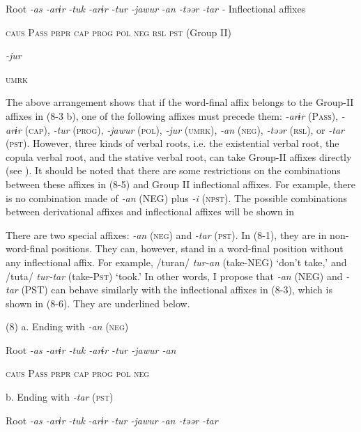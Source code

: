   Root  \textit{{}-as  {}-arɨr} %
\textit{{}-tuk  {}-arɨr  {}-tur  {}-jawur} %
\textit{{}-an  {}-təər  {}-tar  {}-} Inflectional affixes

    \textsc{caus}  P\textsc{ass}  \textsc{prpr}  \textsc{cap}  \textsc{prog}  \textsc{pol}  \textsc{neg}  \textsc{rsl}  \textsc{pst}  (Group II)

          \textit{{}-jur} 

          \textsc{umrk}

The above arrangement shows that if the word-final affix belongs to the Group-II affixes in (8-3 b), one of the following affixes must precede them: \textit{{}-arɨr} (P\textsc{ass}), \textit{-arɨr} (\textsc{cap}), \textit{-tur} (\textsc{prog}), \textit{{}-jawur} (\textsc{pol}), \textit{{}-jur} (\textsc{umrk}), \textit{{}-an} (\textsc{neg}), \textit{{}-təər} (\textsc{rsl}), or \textit{{}-tar} (\textsc{pst}). However, three kinds of verbal roots, i.e. the existential verbal root, the copula verbal root, and the stative verbal root, can take Group-II affixes directly (see ). It should be noted that there are some restrictions on the combinations between these affixes in (8-5) and Group II inflectional affixes. For example, there is no combination made of \textit{{}-an} (NEG) plus \textit{{}-i} (\textsc{npst}). The possible combinations between derivational affixes and inflectional affixes will be shown in 

There are two special affixes: \textit{{}-an} (\textsc{neg}) and \textit{-tar} (\textsc{pst}). In (8-1), they are in non-word-final positions. They can, however, stand in a word-final position without any inflectional affix. For example, /turan/ \textit{tur-an} (take-NEG) ‘don’t take,’ and /tuta/ \textit{tur-tar} (take-P\textsc{st}) ‘took.’ In other words, I propose that \textit{{}-an} (NEG) and \textit{-tar} (PST) can behave similarly with the inflectional affixes in (8-3), which is shown in (8-6). They are underlined below.

(8)  a.  Ending with \textit{{}-an} (\textsc{neg})

    Root  \textit{{}-as  {}-arɨr  {}-tuk  {}-arɨr  {}-tur  {}-jawur  {}-an}   

      \textsc{caus}  P\textsc{ass}  \textsc{prpr}  \textsc{cap}  \textsc{prog}  \textsc{pol}  \textsc{neg}

  b.  Ending with \textit{{}-tar} (\textsc{pst})

    Root  \textit{{}-as  {}-arɨr} %
\textit{{}-tuk}  \textit{{}-arɨr  {}-tur  {}-jawur} %
\textit{{}-an  {}-təər  {}-tar}

